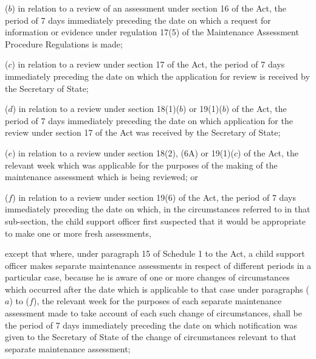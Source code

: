 \documentclass[12pt,a4paper]{article}
\begin{document}
\begin{enumerate}
\begin{enumerate}

($b$) in relation to a review of an assessment under section 16 of the Act, the period of 7 days immediately preceding the date on which a request for information or evidence under regulation 17(5) of the Maintenance Assessment Procedure Regulations is made;

($c$) in relation to a review under section 17 of the Act, the period of 7 days immediately preceding the date on which the application for review is received by the Secretary of State;

($d$) in relation to a review under section 18(1)($b$) or 19(1)($b$) of the Act, the period of 7 days immediately preceding the date on which application for the review under section 17 of the Act was received by the Secretary of State;

($e$) in relation to a review under section 18(2), (6A) or 19(1)($c$) of the Act, the relevant week which was applicable for the purposes of the making of the maintenance assessment which is being reviewed; or

($f$) in relation to a review under section 19(6) of the Act, the period of 7 days immediately preceding the date on which, in the circumstances referred to in that sub-section, the child support officer first suspected that it would be appropriate to make one or more fresh assessments,
\end{enumerate}
except that where, under paragraph 15 of Schedule 1 to the Act, a child support officer makes separate maintenance assessments in respect of different periods in a particular case, because he is aware of one or more changes of circumstances which occurred after the date which is applicable to that case under paragraphs ($a$) to ($f$), the relevant week for the purposes of each separate maintenance assessment made to take account of each such change of circumstances, shall be the period of 7 days immediately preceding the date on which notification was given to the Secretary of State of the change of circumstances relevant to that separate maintenance assessment;  %


\end{enumerate}
\end{document}
